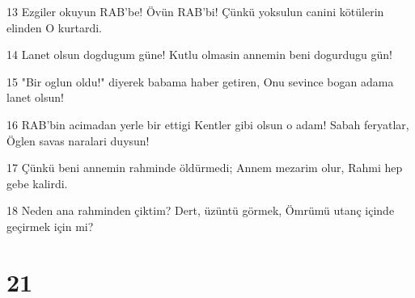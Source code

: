 \par 13 Ezgiler okuyun RAB'be! Övün RAB'bi! Çünkü yoksulun canini kötülerin elinden O kurtardi.
\par 14 Lanet olsun dogdugum güne! Kutlu olmasin annemin beni dogurdugu gün!
\par 15 "Bir oglun oldu!" diyerek babama haber getiren, Onu sevince bogan adama lanet olsun!
\par 16 RAB'bin acimadan yerle bir ettigi Kentler gibi olsun o adam! Sabah feryatlar, Öglen savas naralari duysun!
\par 17 Çünkü beni annemin rahminde öldürmedi; Annem mezarim olur, Rahmi hep gebe kalirdi.
\par 18 Neden ana rahminden çiktim? Dert, üzüntü görmek, Ömrümü utanç içinde geçirmek için mi?

\chapter{21}

